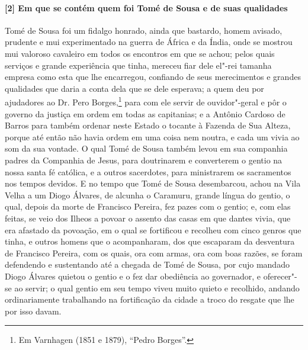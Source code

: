 \begin{linenumbers}
\paragraph{[2] Em que se contém quem foi Tomé de Sousa e de suas qualidades} \quad
Tomé de Sousa foi um fidalgo honrado, ainda que bastardo, homem avisado, prudente e mui
experimentado na guerra de África e da Índia, onde se mostrou mui valoroso cavaleiro em
todos os encontros em que se achou; pelos quais serviços e grande experiência que tinha,
mereceu fiar dele el"-rei tamanha empresa como esta que lhe encarregou, confiando de seus
merecimentos e grandes qualidades que daria a conta dela que se dele esperava; a quem deu
por ajudadores ao Dr. Pero Borges,\footnote{ Em Varnhagen (1851 e 1879), ``Pedro
Borges''.} para com ele servir de ouvidor"-geral e pôr o governo da justiça em ordem em
todas as capitanias; e a Antônio Cardoso de Barros para também ordenar neste Estado o
tocante à Fazenda de Sua Alteza, porque até então não havia ordem em uma coisa nem noutra,
e cada um vivia ao som da sua vontade. O qual Tomé de Sousa também levou em sua companhia
padres da Companhia de Jesus, para doutrinarem e converterem o gentio na nossa santa fé
católica, e a outros sacerdotes, para ministrarem os sacramentos nos tempos devidos. E no
tempo que Tomé de Sousa desembarcou, achou na Vila Velha a um Diogo Álvares, de alcunha o
Caramuru, grande língua do gentio, o qual, depois da morte de Francisco Pereira, fez pazes
com o gentio; e, com elas feitas, se veio dos Ilheos a povoar o assento das casas em que
dantes vivia, que era afastado da povoação, em o qual se fortificou e recolheu com cinco
genros que tinha, e outros homens que o acompanharam, dos que escaparam da desventura de
Francisco Pereira, com os quais, ora com armas, ora com boas razões, se foram defendendo e
sustentando até a chegada de Tomé de Sousa, por cujo mandado Diogo Álvares quietou o
gentio e o fez dar obediência ao governador, e oferecer"-se ao servir; o qual gentio em seu
tempo viveu muito quieto e recolhido, andando ordinariamente trabalhando na fortificação
da cidade a troco do resgate que lhe por isso davam.


\end{linenumbers}
